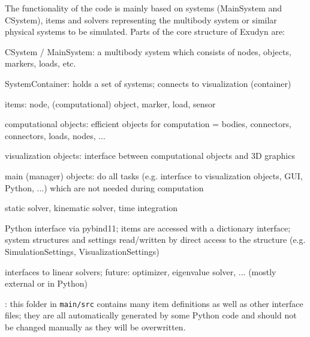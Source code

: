 The functionality of the code is mainly based on systems (MainSystem and CSystem), items and solvers representing the multibody system or similar physical systems to be simulated. Parts of the core structure of Exudyn are:
\bi
  \item CSystem / MainSystem: a multibody system which consists of nodes, objects, markers, loads, etc.
  \item SystemContainer: holds a set of systems; connects to visualization (container)
  \item items: node, (computational) object, marker, load, sensor
  \item computational objects: efficient objects for computation = bodies, connectors, connectors, loads, nodes, ...
  \item visualization objects: interface between computational objects and 3D graphics
  \item main (manager) objects: do all tasks (e.g. interface to visualization objects, GUI, Python, ...) which are not needed during computation
  \item static solver, kinematic solver, time integration
  \item Python interface via pybind11; items are accessed with a dictionary interface; system structures and settings read/written by direct access to the structure (e.g. SimulationSettings, VisualizationSettings)
  \item interfaces to linear solvers; future: optimizer, eigenvalue solver, ... (mostly external or in Python)
  \item {}: this folder in \texttt{main/src} contains many item definitions as well as other interface files; they are all automatically generated by some Python code and should not be changed manually as they will be overwritten.
\ei


